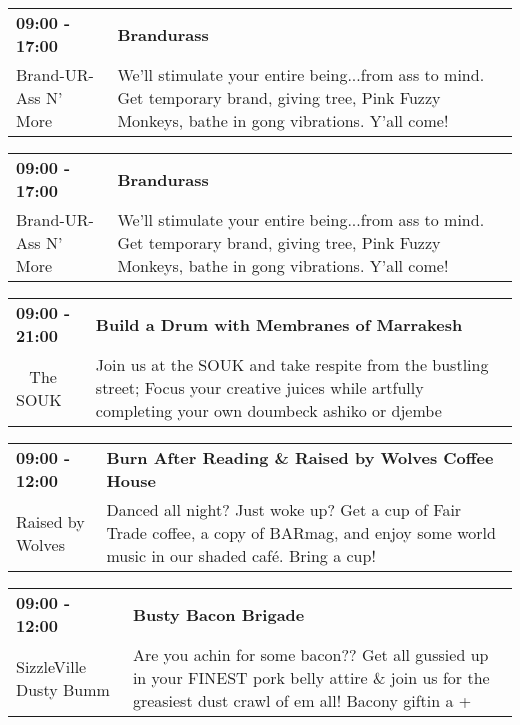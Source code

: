 \begin{tabular}{ p{1in} p{2.2in} }
    \textbf{09:00 - 17:00} & \textbf{Brandurass} \\
    Brand-UR-Ass N' More \newline  & We'll stimulate your entire being...from ass to mind. Get temporary brand, giving tree, Pink Fuzzy Monkeys, bathe in gong vibrations. Y'all come! \\
    \hline 
\end{tabular}
    
\begin{tabular}{ p{1in} p{2.2in} }
    \textbf{09:00 - 17:00} & \textbf{Brandurass} \\
    Brand-UR-Ass N' More \newline  & We'll stimulate your entire being...from ass to mind. Get temporary brand, giving tree, Pink Fuzzy Monkeys, bathe in gong vibrations. Y'all come! \\
    \hline 
\end{tabular}
    
\begin{tabular}{ p{1in} p{2.2in} }
    \textbf{09:00 - 21:00} & \textbf{Build a Drum with Membranes of Marrakesh} \\
    ~ \newline The SOUK & Join us at the SOUK and take respite from the bustling street; Focus your creative juices while artfully completing your own doumbeck ashiko or djembe \\
    \hline 
\end{tabular}
    
\begin{tabular}{ p{1in} p{2.2in} }
    \textbf{09:00 - 12:00} & \textbf{Burn After Reading \& Raised by Wolves Coffee House} \\
    Raised by Wolves \newline  & Danced all night? Just woke up? Get a cup of Fair Trade coffee, a copy of BARmag, and enjoy some world music in our shaded caf\'e. Bring a cup! \\
    \hline 
\end{tabular}
    
\begin{tabular}{ p{1in} p{2.2in} }
    \textbf{09:00 - 12:00} & \textbf{Busty Bacon Brigade} \\
    SizzleVille \newline Dusty Bumm & Are you achin for some bacon?? Get all gussied up in your FINEST pork belly attire \& join us for the greasiest dust crawl of em all! Bacony giftin a + \\
    \hline 
\end{tabular}
    
